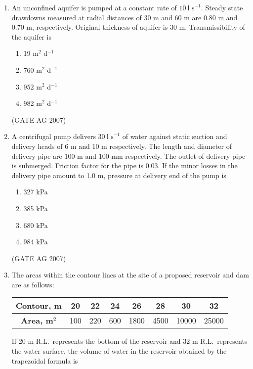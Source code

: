 \documentclass[journal,12pt,onecolumn]{IEEEtran}
\theoremstyle{remark}
\begin{document}
\begin{enumerate}[label=Q\arabic*:]
\item An unconfined aquifer is pumped at a constant rate of $10 \ \text{l s}^{-1}$. Steady state drawdowns measured at radial distances of 30 m and 60 m are 0.80 m and 0.70 m, respectively. Original thickness of aquifer is 30 m. Transmissibility of the aquifer is
\begin{multicols}{4}
\begin{enumerate}
    \item 19 m$^2$ d$^{-1}$
    \item 760 m$^2$ d$^{-1}$
    \item 952 m$^2$ d$^{-1}$
    \item 982 m$^2$ d$^{-1}$
\end{enumerate}
\end{multicols}
\hfill(GATE AG 2007)

\item A centrifugal pump delivers $30 \ \text{l s}^{-1}$ of water against static suction and delivery heads of 6 m and 10 m respectively. The length and diameter of delivery pipe are 100 m and 100 mm respectively. The outlet of delivery pipe is submerged. Friction factor for the pipe is 0.03. If the minor losses in the delivery pipe amount to 1.0 m, pressure at delivery end of the pump is
\begin{multicols}{4}
\begin{enumerate}
    \item 327 kPa
    \item 385 kPa
    \item 680 kPa
    \item 984 kPa
\end{enumerate}
\end{multicols}
\hfill(GATE AG 2007)

\item The areas within the contour lines at the site of a proposed reservoir and dam are as follows:

\begin{table}[H]
\centering
\begin{tabular}{|c|c|c|c|c|c|c|c|}
\hline
\textbf{Contour, m} & 20 & 22 & 24 & 26 & 28 & 30 & 32 \\
\hline
\textbf{Area, m$^2$} & 100 & 220 & 600 & 1800 & 4500 & 10000 & 25000 \\
\hline
\end{tabular}
\end{table}

If 20 m R.L.\ represents the bottom of the reservoir and 32 m R.L.\ represents the water surface, the volume of water in the reservoir obtained by the trapezoidal formula is
\begin{multicols}{4}


\end{multicols}
\end{enumerate}
\end{document}
